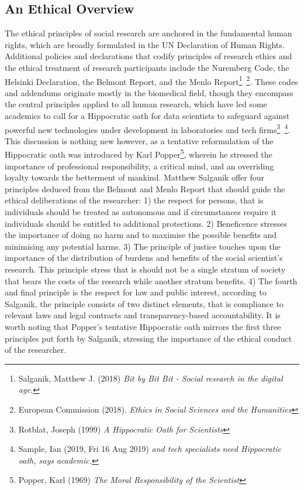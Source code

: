 \documentclass[12pt,a4paper]{article}
\begin{document}
\subsection{An Ethical Overview}
The ethical principles of social research are anchored in the fundamental human rights, which are broadly formulated in the UN Declaration of Human Rights. Additional policies and declarations that codify principles of research ethics and the ethical treatment of research participants include the Nuremberg Code, the Helsinki Declaration, the Belmont Report, and the Menlo Report\footnote{Salganik, Matthew J. (2018) \textit{Bit by Bit Bit - Social research in the digital age.}}\, \footnote{European Commission (2018). \textit{Ethics in Social Sciences and the Humanities}}. These codes and addendums originate mostly in the biomedical field, though they encompass the central principles applied to all human research, which have led some academics to call for a Hippocratic oath for data scientists to safeguard against powerful new technologies under development in laboratories and tech firms\footnote{Rotblat, Joseph (1999) \textit{A Hippocratic Oath for Scientists}}\, \footnote{Sample, Ian (2019, Fri 16 Aug 2019) \textit{and tech specialists need Hippocratic oath, says academic.}}. This discussion is nothing new however, as a tentative reformulation of the Hippocratic oath was introduced by Karl Popper\footnote{Popper, Karl (1969) \textit{The Moral Responsibility of the Scientist}}, wherein he stressed the importance of professional responsibility, a critical mind, and an overriding loyalty towards the betterment of mankind.\newline
Matthew Salganik offer four principles deduced from the Belmont and Menlo Report that should guide the ethical deliberations of the researcher: 1) the respect for persons, that is individuals should be treated as autonomous and if circumstances require it individuals should be entitled to additional protections. 2) Beneficence stresses the importance of doing no harm and to maximise the possible benefits and minimising any potential harms. 3) The principle of justice touches upon the importance of the distribution of burdens and benefits of the social scientist's research. This principle stress that is should not be a single stratum of society that bears the costs of the research while another stratum benefits. 4) The fourth and final principle is the respect for law and public interest, according to Salganik, the principle consists of two distinct elements, that is compliance to relevant laws and legal contracts and transparency-based accountability. It is worth noting that Popper’s tentative Hippocratic oath mirrors the first three principles put forth by Salganik, stressing the importance of the ethical conduct of the researcher.\newline
\end{document}
